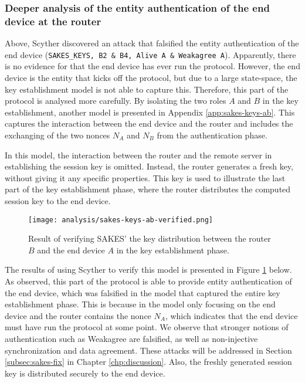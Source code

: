 \subsubsection{Deeper analysis of the entity authentication of the end device at the router}

Above, Scyther discovered an attack that falsified the entity authentication of the end device (\texttt{SAKES\_KEYS, B2 \& B4, Alive A \& Weakagree A}). Apparently, there is no evidence for that the end device has ever run the protocol. However, the end device is the entity that kicks off the protocol, but due to a large state-space, the key establishment model is not able to capture this. Therefore, this part of the protocol is analysed more carefully. By isolating the two roles $A$ and $B$ in the key establishment, another model is presented in Appendix \ref{app:sakes-keys-ab}. This captures the interaction between the end device and the router and includes the exchanging of the two nonces $N_A$ and $N_B$ from the authentication phase.

In this model, the interaction between the router and the remote server in establishing the session key is omitted. Instead, the router generates a fresh key, without giving it any specific properties. This key is used to illustrate the last part of the key establishment phase, where the router distributes the computed session key to the end device.

\begin{figure}[h]
	\centering
	\texttt{[image: analysis/sakes-keys-ab-verified.png]}
	\caption[Result of verifying SAKES' the key distribution between the router and the end device in the key establishment phase.]{Result of verifying SAKES' the key distribution between the router $B$ and the end device $A$ in the key establishment phase.}
	\label{fig:sakes-verified-keys-ab}
\end{figure}

The results of using Scyther to verify this model is presented in Figure \ref{fig:sakes-verified-keys-ab} below. As observed, this part of the protocol is able to provide entity authentication of the end device, which was falsified in the model that captured the entire key establishment phase. This is because in the model only focusing on the end device and the router contains the nonce $N_A$, which indicates that the end device must have run the protocol at some point. We observe that stronger notions of authentication such as Weakagree are falsified, as well as non-injective synchronization and data agreement. These attacks will be addressed in Section \ref{subsec:sakes-fix} in Chapter \ref{chp:discussion}. Also, the freshly generated session key is distributed securely to the end device.



